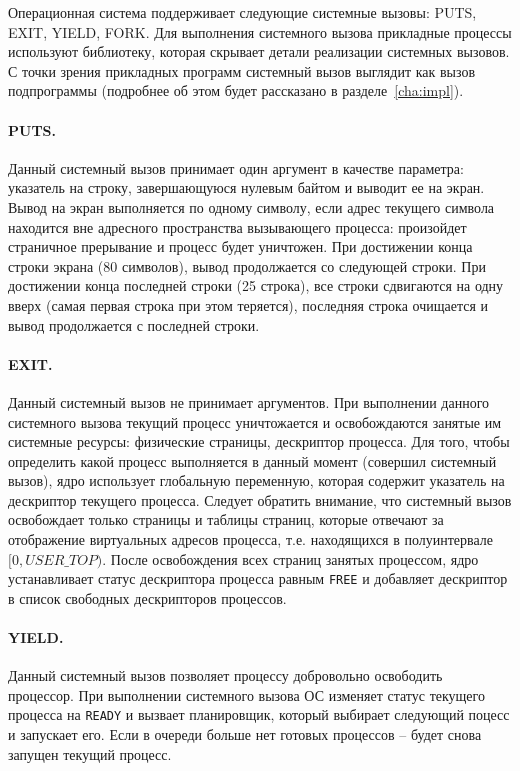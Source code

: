 Операционная система поддерживает следующие системные вызовы: PUTS, EXIT, YIELD, FORK.
Для выполнения системного вызова прикладные процессы используют библиотеку, которая
скрывает детали реализации системных вызовов. С точки зрения прикладных программ системный
вызов выглядит как вызов подпрограммы (подробнее об этом будет рассказано в разделе~\ref{cha:impl}).

\paragraph{PUTS.} Данный системный вызов принимает один аргумент в качестве параметра: указатель на
строку, завершающуюся нулевым байтом и выводит ее на экран. Вывод на экран выполняется по одному
символу, если адрес текущего символа находится вне адресного пространства вызывающего процесса:
произойдет страничное прерывание и процесс будет уничтожен. При достижении конца строки экрана (80 символов),
вывод продолжается со следующей строки. При достижении конца последней строки (25 строка), все строки
сдвигаются на одну вверх (самая первая строка при этом теряется), последняя строка очищается и вывод
продолжается с последней строки.

\paragraph{EXIT.} Данный системный вызов не принимает аргументов. При выполнении данного системного
вызова текущий процесс уничтожается и освобождаются занятые им системные ресурсы: физические страницы,
дескриптор процесса. Для того, чтобы определить какой процесс выполняется в данный момент (совершил
системный вызов), ядро использует глобальную переменную, которая содержит указатель на дескриптор
текущего процесса. Следует обратить внимание, что системный вызов освобождает только страницы и таблицы
страниц, которые отвечают за отображение виртуальных адресов процесса, т.е. находящихся
в полуинтервале $[0, USER\_TOP)$. После освобождения всех страниц занятых процессом, ядро устанавливает
статус дескриптора процесса равным \texttt{FREE} и добавляет дескриптор в список свободных
дескрипторов процессов.

\paragraph{YIELD.} Данный системный вызов позволяет процессу добровольно освободить процессор. При
выполнении системного вызова ОС изменяет статус текущего процесса на \texttt{READY} и вызвает
планировщик, который выбирает следующий поцесс и запускает его. Если в очереди больше нет готовых
процессов -- будет снова запущен текущий процесс.

